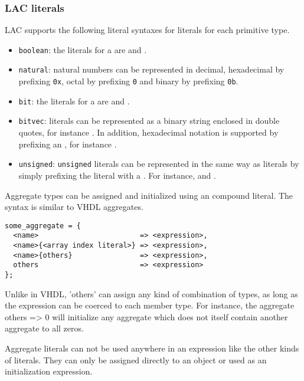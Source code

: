
\subsubsection{LAC literals}
\label{sec:core-ug-cfg-cregs-literals}

LAC supports the following literal syntaxes for literals for each primitive
type.

\begin{itemize}

\item \texttt{boolean}: the literals for a  are 
and .

\item \texttt{natural}: natural numbers can be represented in decimal,
hexadecimal by prefixing \texttt{0x}, octal by prefixing \texttt{0} and binary
by prefixing \texttt{0b}.

\item \texttt{bit}: the literals for a  are  and
.

\item \texttt{bitvec}:  literals can be represented as a
binary string enclosed in double quotes, for instance . In
addition, hexadecimal notation is supported by prefixing an , for
instance .

\item \texttt{unsigned}: \texttt{unsigned} literals can be represented in
the same way as  literals by simply prefixing the literal with a
. For instance,  and .

\end{itemize}

\noindent Aggregate types can be assigned and initialized using an compound 
literal. The syntax is similar to VHDL aggregates.

\begin{lstlisting}[numbers=none, language=nothing]
some_aggregate = {
  <name>                        => <expression>,
  <name>{<array index literal>} => <expression>,
  <name>{others}                => <expression>,
  others                        => <expression>
};
\end{lstlisting}

\noindent Unlike in VHDL, 'others' can assign any kind of combination of types, 
as long as the expression can be coerced to each member type. For instance, the 
aggregate {others => 0} will initialize any aggregate which does not itself 
contain another aggregate to all zeros.

Aggregate literals can not be used anywhere in an expression like the other
kinds of literals. They can only be assigned directly to an object or used as an
initialization expression.
